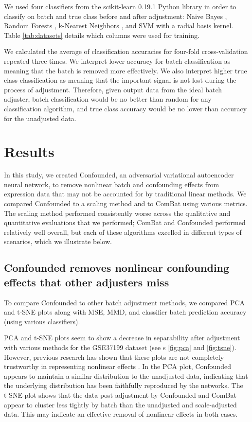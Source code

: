 \documentclass[11pt]{article}
\begin{document}
We used four classifiers from the scikit-learn 0.19.1 Python library \cite{pedregosa_scikit-learn_2011} in order to classify on batch and true class before and after adjustment: Naive Bayes \citep{maron_automatic_1961}, Random Forests \citep{tin_kam_ho_random_1995}, k-Nearest Neighbors \citep{fix_discriminatory_1951}, and SVM \citep{cortes_support-vector_1995} with a radial basis kernel.
Table \ref{tab:datasets} details which columns were used for training.

We calculated the average of classification accuracies for four-fold cross-validation repeated three times.
We interpret lower accuracy for batch classification as meaning that the batch is removed more effectively.
We also interpret higher true class classification as meaning that the important signal is not lost during the process of adjustment.
Therefore, given output data from the ideal batch adjuster, batch classification would be no better than random for any classification algorithm, and true class accuracy would be no lower than accuracy for the unadjusted data.

\section{Results} \label{sec:results}

In this study, we created Confounded, an adversarial variational autoencoder neural network, to remove nonlinear batch and confounding effects from expression data that may not be accounted for by traditional linear methods.
We compared Confounded to a scaling method and to ComBat \citep{johnson_adjusting_2007} using various metrics.
The scaling method performed consistently worse across the qualitative and quantitative evaluations that we performed;
ComBat and Confounded performed relatively well overall, but each of these algorithms excelled in different types of scenarios, which we illustrate below.

\subsection{Confounded removes nonlinear confounding effects that other adjusters miss}

To compare Confounded to other batch adjustment methods, we compared PCA and t-SNE plots along with MSE, MMD, and classifier batch prediction accuracy (using various classifiers).

PCA and t-SNE plots seem to show a decrease in separability after adjustment with various methods for the GSE37199 dataset (see \figurename{s} \ref{fig:pca} and \ref{fig:tsne}).
However, previous research has shown that these plots are not completely trustworthy in representing nonlinear effects \cite{dayton_classifying_2017-1}.
In the PCA plot, Confounded appears to maintain a similar distribution to the unadjusted data, indicating that the underlying distribution has been faithfully reproduced by the networks.
The t-SNE plot shows that the data post-adjustment by Confounded and ComBat appear to cluster less tightly by batch than the unadjusted and scale-adjusted data.
This may indicate an effective removal of nonlinear effects in both cases.
\end{document}
